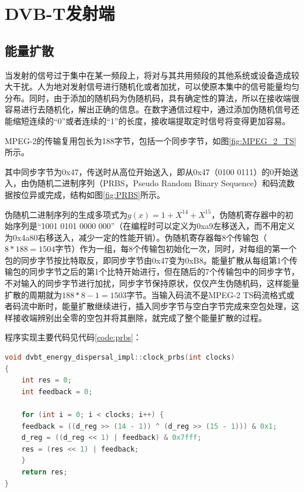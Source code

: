 \chapter{DVB-T发射端}
	\section{能量扩散}
		\par 当发射的信号过于集中在某一频段上，将对与其共用频段的其他系统或设备造成较大干扰。人为地对发射信号进行随机化或者加扰，可以使原本集中的信号能量均匀分布。同时，由于添加的随机码为伪随机码，具有确定性的算法，所以在接收端很容易进行去随机化，解出正确的信息。在数字通信过程中，通过添加伪随机信号还能缩短连续的“0”或者连续的“1”的长度，接收端提取定时信号将变得更加容易\cite{数字电视DVB标准能量扩散的FPGA设计与实现_肖闽进}。
		\par MPEG-2的传输复用包长为188字节，包括一个同步字节，如图\ref{fig:MPEG_2_TS}所示。		
		
		\par 其中同步字节为0x47，传送时从高位开始送入，即从0x47（0100 0111）的0开始送入，由伪随机二进制序列（PRBS，Pseudo Random Binary Sequence）和码流数据按位异或完成，结构如图\ref{fig:PRBS}所示。
		
		\par 伪随机二进制序列的生成多项式为$g(x)=1+X^{14}+X^{15}$，伪随机寄存器中的初始序列是“1001 0101 0000 000”（在编程时可以定义为0xa9左移送入，而不用定义为0x4a80右移送入，减少一定的性能开销）。伪随机寄存器每8个传输包（$8*188=1504$字节）作为一组，每8个传输包初始化一次，同时，对每组的第一个包的同步字节按比特取反，即同步字节由0x47变为0xB8。能量扩散从每组第1个传输包的同步字节之后的第1个比特开始进行，但在随后的7个传输包中的同步字节，不对输入的同步字节进行加扰，同步字节保持原状，仅仅产生伪随机码，这样能量扩散的周期就为$188*8-1=1503$字节。当输入码流不是MPEG-2 TS码流格式或者码流中断时，能量扩散继续进行，插入同步字节与空白字节完成来空包处理，这样接收端辨别出全零的空包并将其删除，就完成了整个能量扩散的过程。
		\par 程序实现主要代码见代码\ref{code:prbs}：
		\begin{lstlisting}[caption = {能量扩散}, label = {code:prbs}, language = C++ ]
void dvbt_energy_dispersal_impl::clock_prbs(int clocks)
{
	int res = 0;
	int feedback = 0;

	for (int i = 0; i < clocks; i++) {
	feedback = ((d_reg >> (14 - 1)) ^ (d_reg >> (15 - 1))) & 0x1;
	d_reg = ((d_reg << 1) | feedback) & 0x7fff;
	res = (res << 1) | feedback;
	}
	return res;
}
		\end{lstlisting}
